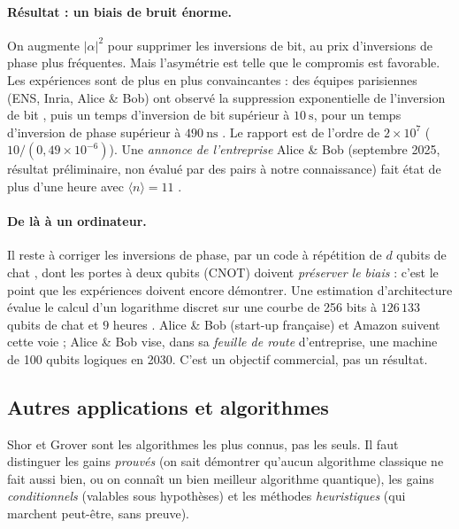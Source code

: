 \paragraph{Résultat : un biais de bruit énorme.} On augmente $|\alpha|^2$ pour supprimer les inversions de bit, au prix d'inversions de phase
plus fréquentes. Mais l'asymétrie est telle que le compromis est favorable. Les expériences sont de plus en plus convaincantes :
des équipes parisiennes (ENS, Inria, Alice \& Bob) ont observé la suppression exponentielle de l'inversion de bit
\parencite{lescanne2020}, puis un temps d'inversion de bit supérieur à $10\ \mathrm{s}$, pour un temps d'inversion de phase supérieur à
$490\ \mathrm{ns}$ \parencite{reglade2024}. Le rapport est de l'ordre de $2\times10^{7}$ ($10/(0{,}49\times10^{-6})$). Une \emph{annonce de l'entreprise} Alice \& Bob (septembre 2025, résultat préliminaire, non évalué par des pairs à
notre connaissance) fait état de plus d'une heure avec $\langle n\rangle=11$ \parencite{aliceandbob2025}.

\paragraph{De là à un ordinateur.} Il reste à corriger les inversions de phase, par un code à répétition de $d$ qubits de chat
\parencite{guillaud2019}, dont les portes à deux qubits (CNOT) doivent \emph{préserver le biais} : c'est le point que les expériences
doivent encore démontrer. Une estimation d'architecture évalue le calcul d'un logarithme discret sur une courbe de 256 bits à
$126\,133$ qubits de chat et $9$ heures \parencite{gouzien2023}. Alice \& Bob (start-up française) et Amazon \parencite{putterman2025} suivent cette voie ;
Alice \& Bob vise, dans sa \emph{feuille de route} d'entreprise, une machine de 100 qubits logiques en 2030. C'est un objectif commercial, pas un résultat.

\subsection{Autres applications et algorithmes}\label{sec:autres}

Shor et Grover sont les algorithmes les plus connus, pas les seuls. Il faut distinguer les gains \emph{prouvés} (on sait démontrer
qu'aucun algorithme classique ne fait aussi bien, ou on connaît un bien meilleur algorithme quantique), les gains
\emph{conditionnels} (valables sous hypothèses) et les méthodes \emph{heuristiques} (qui marchent peut-être, sans preuve).

